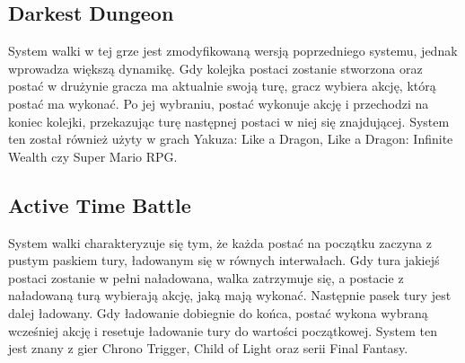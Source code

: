 \documentclass{SGGW-thesis}
\begin{document}
\subsection{Darkest Dungeon}
System walki w tej grze jest zmodyfikowaną wersją poprzedniego systemu, jednak wprowadza większą dynamikę. 
Gdy kolejka postaci zostanie stworzona oraz postać w drużynie gracza ma aktualnie swoją turę, gracz wybiera akcję, 
którą postać ma wykonać. Po jej wybraniu, postać wykonuje akcję i przechodzi na koniec kolejki, przekazując turę następnej postaci w 
niej się znajdującej. System ten został również użyty w grach Yakuza: Like a Dragon, Like a Dragon: Infinite Wealth czy Super Mario RPG.
\subsection{Active Time Battle}
System walki charakteryzuje się tym, że każda postać na początku zaczyna z pustym paskiem tury, ładowanym się w równych interwałach. 
Gdy tura jakiejś postaci zostanie w pełni naładowana, walka zatrzymuje się, a postacie z naładowaną turą wybierają akcję, jaką mają wykonać. 
Następnie pasek tury jest dalej ładowany. Gdy ładowanie dobiegnie do końca, postać wykona wybraną wcześniej akcję i resetuje ładowanie tury 
do wartości początkowej. System ten jest znany z gier Chrono Trigger, Child of Light oraz serii Final Fantasy.
\end{document}
